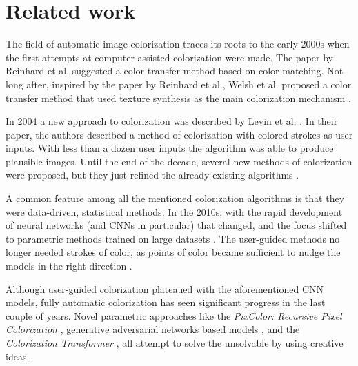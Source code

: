 \chapter{Related work}

The field of automatic image colorization traces its roots to the early 2000s
when the first attempts at computer-assisted colorization were made. The paper
by Reinhard et al. \citep{reinhard2001colorization} suggested a color transfer method
based on color matching. Not long after, inspired by the paper by Reinhard et al., 
Welsh et al. proposed a color transfer method that used texture synthesis as the main
colorization mechanism \citep{welsh2002colorization}. 

In 2004 a new approach to colorization was described by Levin et al. 
\citep{levin2004colorization}. In their paper, the authors described a method of 
colorization with colored strokes as user inputs. With less than a dozen user inputs the
algorithm was able to produce plausible images. Until the end of the decade, several 
new methods of colorization were proposed, but they just refined the already 
existing algorithms \citep{luan2007colorization}\citep{charpiat2008colorization}.

A common feature among all the mentioned colorization algorithms is that 
they were data-driven, statistical methods. In the 2010s, with the rapid development 
of neural networks (and CNNs in particular) that changed, and the focus shifted
to parametric methods trained on large datasets 
\citep{cheng2015colorization}\citep{deshpande2015colorization}. The user-guided methods
no longer needed strokes of color, as points of color became sufficient to nudge 
the models in the right direction \citep{zhang2017ideep}.

Although user-guided colorization plateaued with the aforementioned CNN 
models, fully automatic colorization has seen significant progress in the 
last couple of years. Novel parametric approaches like the 
\textit{PixColor: Recursive Pixel Colorization} \citep{guadarrama2017colorization},
generative adversarial networks based models \citep{nazeri2018gan}, and the \textit{Colorization 
Transformer} \citep{kumar2021colorization}, all attempt to solve the unsolvable by using creative 
ideas.